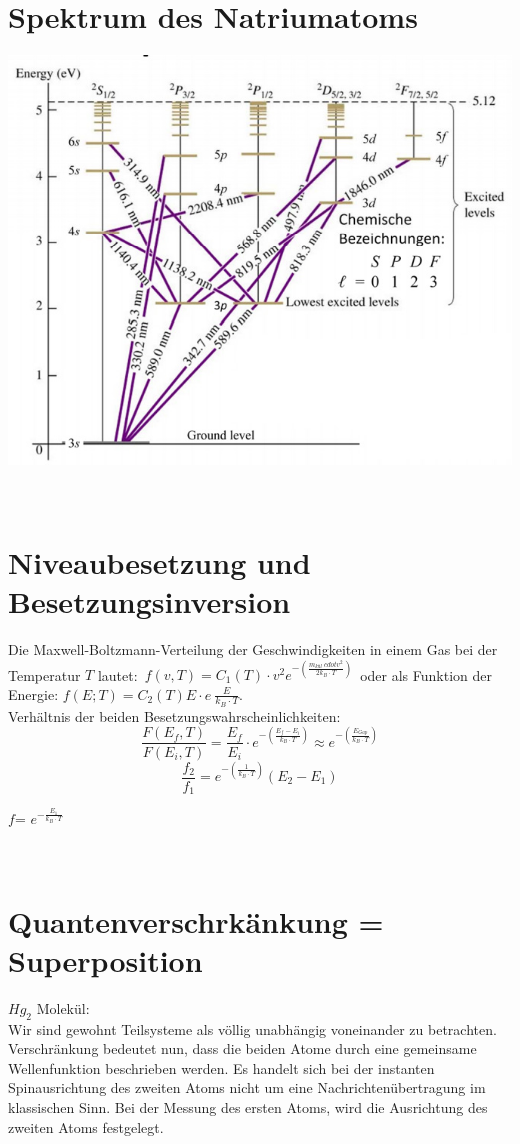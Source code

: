 \section{Spektrum des Natriumatoms}
\begin{center}
	\includegraphics[scale = 0.3]{images/spektrum_na.jpg}
\end{center}
\
\\
\section{Niveaubesetzung und Besetzungsinversion}
Die Maxwell-Boltzmann-Verteilung der Geschwindigkeiten in einem Gas bei der Temperatur $T$ lautet:\
 $f(v,T)=C_1(T)\cdot v^2 e^{-\left( \frac{m_{kül} \ cdot v^2}{2k_B\cdot T} \right) }$\
 oder als Funktion der Energie: $f(E;T)=C_2(T)E\cdot e~{ \frac{E}{k_B\cdot T}}$.\
 \\
 Verhältnis der beiden Besetzungswahrscheinlichkeiten:
 \[
 	\frac{F(E_f,T)}{F(E_i,T)}=\frac{E_f}{E_i}\cdot e^{-\left( \frac{E_f-E_i}{k_B\cdot T}\right) }
 	\approx	
 	e^{-\left( \frac{E_{Gap}}{k_B\cdot T}\right) }
 \]
 \[
 	\frac{f_2}{f_1}=e^{-\left( \frac{1}{k_B\cdot T}  \right) }\left(  E_2-E_1 \right) 
 \]
 \begin{footnotesize}
 	$f$=	$e^{- \frac{E_1}{k_B \cdot T}}$\\
 \end{footnotesize}
 \
 \\
 \section{Quantenverschrkänkung = Superposition}
 $Hg_2$ Molekül:\\
 Wir sind gewohnt Teilsysteme als völlig unabhängig voneinander zu betrachten. Verschränkung bedeutet nun, dass die beiden Atome durch eine gemeinsame Wellenfunktion beschrieben werden. Es handelt sich bei der instanten Spinausrichtung des zweiten Atoms nicht um eine Nachrichtenübertragung im klassischen Sinn. Bei der Messung des ersten Atoms, wird die Ausrichtung des zweiten Atoms festgelegt.\
 \\
